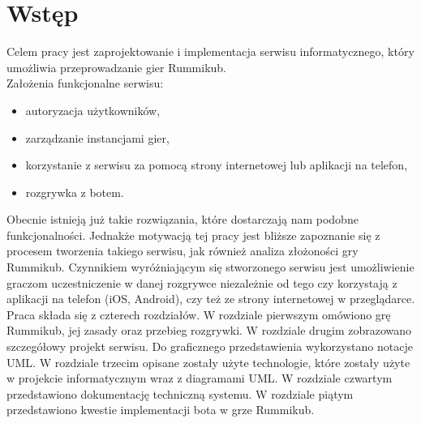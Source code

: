 \chapter*{Wstęp}

\thispagestyle{chapterBeginStyle}

Celem pracy jest zaprojektowanie i implementacja serwisu informatycznego, który umożliwia przeprowadzanie gier Rummikub.
\\

Założenia funkcjonalne serwisu:
	\begin{itemize}
		\item autoryzacja użytkowników,
		\item zarządzanie instancjami gier,
		\item korzystanie z serwisu za pomocą strony internetowej lub aplikacji na telefon,
		\item rozgrywka z botem. \\
	\end{itemize} 

Obecnie istnieją już takie rozwiązania, które dostarczają nam podobne funkcjonalności. Jednakże motywacją tej pracy jest bliższe zapoznanie się z procesem tworzenia takiego serwisu, jak również analiza złożoności gry Rummikub. Czynnikiem wyróżniającym się stworzonego serwisu jest umożliwienie graczom uczestniczenie w danej rozgrywce niezależnie od tego czy korzystają z aplikacji na telefon (iOS, Android), czy też ze strony internetowej w przeglądarce. \\

Praca składa się z czterech rozdziałów. W rozdziale pierwszym omówiono grę Rummikub, jej zasady oraz przebieg rozgrywki. W rozdziale drugim zobrazowano szczegółowy projekt serwisu. Do graficznego przedstawienia wykorzystano notacje UML. W rozdziale trzecim opisane zostały użyte technologie, które zostały użyte w projekcie informatycznym wraz z diagramami UML. W rozdziale czwartym przedstawiono dokumentację techniczną systemu. W rozdziale piątym przedstawiono kwestie implementacji bota w grze Rummikub.